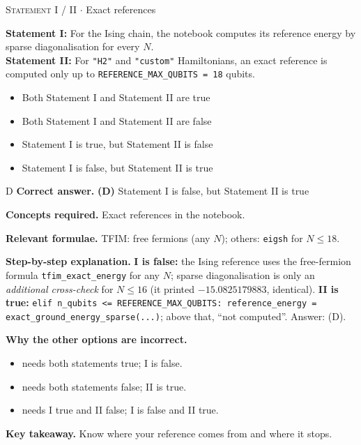 \documentclass[11pt,a4paper]{article}
\newcommand{\optlabel}[1]{\textbf{(#1)}}
\newcommand{\correctlabel}[1]{\textcolor{okgreen}{\textbf{(#1)}\,\ding{51}}}
\newenvironment{qitem}[1]{\begin{list}{}{\setlength{\leftmargin}{3.3em}\setlength{\labelwidth}{3.1em}%
  \setlength{\labelsep}{0.2em}\setlength{\topsep}{3pt}\setlength{\parsep}{3pt}}\item[\textbf{Q.#1}\hfill]}{\end{list}}
\newcommand{\qsep}{\par\vspace{2pt}{\color{black!15}\hrule}\vspace{4pt}}
\newcommand{\qmeta}[2]{{\footnotesize\color{black!60}\textsc{#1} \;$\cdot$\; #2}\par}
\begin{document}
\begin{qitem}{74}
\qmeta{Statement I / II}{Exact references}
\textbf{Statement I:} For the Ising chain, the notebook computes its reference energy by sparse diagonalisation for every $N$.\\[1mm]
\textbf{Statement II:} For \texttt{"H2"} and \texttt{"custom"} Hamiltonians, an exact reference is computed only up to \texttt{REFERENCE\_MAX\_QUBITS = 18} qubits.
\begin{itemize}[leftmargin=2.6em, labelsep=0.4em, itemsep=2pt, topsep=3pt]
\item[\optlabel{A}] Both Statement I and Statement II are true
\item[\optlabel{B}] Both Statement I and Statement II are false
\item[\optlabel{C}] Statement I is true, but Statement II is false
\item[\correctlabel{D}] Statement I is false, but Statement II is true
\end{itemize}
\end{qitem}
\begin{solbox}{D}
\textbf{\color{brand}Correct answer.} \textcolor{okgreen}{\textbf{(D)}} Statement I is false, but Statement II is true

\textbf{\color{brand}Concepts required.} Exact references in the notebook.

\textbf{\color{brand}Relevant formulae.} TFIM: free fermions (any $N$); others: \texttt{eigsh} for $N \le 18$.

\textbf{\color{brand}Step-by-step explanation.} \textbf{I is false:} the Ising reference uses the free-fermion formula \texttt{tfim\_exact\_energy} for any $N$; sparse diagonalisation is only an
\emph{additional cross-check} for $N \le 16$ (it printed $-15.0825179883$, identical).
\textbf{II is true:} \texttt{elif n\_qubits <= REFERENCE\_MAX\_QUBITS: reference\_energy = exact\_ground\_energy\_sparse(...)}; above that, ``not computed''. Answer: (D).

\textbf{\color{brand}Why the other options are incorrect.}
\begin{itemize}[leftmargin=2.4em, itemsep=1pt, topsep=2pt]
\item[\textbf{(A)}] needs both statements true; I is false.
\item[\textbf{(B)}] needs both statements false; II is true.
\item[\textbf{(C)}] needs I true and II false; I is false and II true.
\end{itemize}
\textbf{\color{brand}Key takeaway.} Know where your reference comes from and where it stops.
\end{solbox}
\qsep
\end{document}
